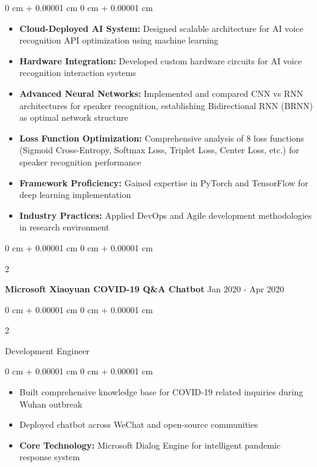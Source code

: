 \documentclass[10pt, a4paper]{article}
\newenvironment{highlights}{
    \begin{itemize}[
        topsep=0.15 cm,
        parsep=0.08 cm,
        partopsep=0pt,
        itemsep=0.05 cm,
        leftmargin=0 cm + 10pt
    ]
}{
    \end{itemize}
} %
\newenvironment{onecolentry}{
    \begin{adjustwidth}{
        0 cm + 0.00001 cm
    }{
        0 cm + 0.00001 cm
    }
}{
    \end{adjustwidth}
} %
\newenvironment{twocolentry}[2][]{
    \onecolentry
    \def\secondColumn{#2}
    \setcolumnwidth{\fill, 4.5 cm}
    \begin{paracol}{2}
}{
    \switchcolumn \raggedleft \secondColumn
    \end{paracol}
    \endonecolentry
} %
\begin{document}
        \vspace{0.10 cm}
        \begin{onecolentry}
            \begin{highlights}
                \item \textbf{Cloud-Deployed AI System:} Designed scalable architecture for AI voice recognition API optimization using machine learning
                \item \textbf{Hardware Integration:} Developed custom hardware circuits for AI voice recognition interaction systems
                \item \textbf{Advanced Neural Networks:} Implemented and compared CNN vs RNN architectures for speaker recognition, establishing Bidirectional RNN (BRNN) as optimal network structure
                \item \textbf{Loss Function Optimization:} Comprehensive analysis of 8 loss functions (Sigmoid Cross-Entropy, Softmax Loss, Triplet Loss, Center Loss, etc.) for speaker recognition performance
                \item \textbf{Framework Proficiency:} Gained expertise in PyTorch and TensorFlow for deep learning implementation
                \item \textbf{Industry Practices:} Applied DevOps and Agile development methodologies in research environment
            \end{highlights}
        \end{onecolentry}

        \vspace{0.2 cm}

        \begin{twocolentry}{
            Jan 2020 - Apr 2020
        }
            \textbf{Microsoft Xiaoyuan COVID-19 Q\&A Chatbot}\end{twocolentry}

        \begin{twocolentry}{
            
        }
            Development Engineer\end{twocolentry}

        \vspace{0.10 cm}
        \begin{onecolentry}
            \begin{highlights}
                \item Built comprehensive knowledge base for COVID-19 related inquiries during Wuhan outbreak
                \item Deployed chatbot across WeChat and open-source communities
                \item \textbf{Core Technology:} Microsoft Dialog Engine for intelligent pandemic response system
            \end{highlights}
        \end{onecolentry}
\end{document}
